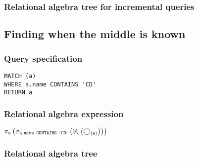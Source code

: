 \subsubsection*{Relational algebra tree for incremental queries}


\subsection{Finding when the middle is known}

\subsubsection*{Query specification}

\begin{lstlisting}
MATCH (a)
WHERE a.name CONTAINS 'CD'
RETURN a
\end{lstlisting}

\subsubsection*{Relational algebra expression}

$\projection{\var{a}} \left(\selection{\mathtt{a.name~CONTAINS~'CD'}} \left(\alldifferent{} \left(\getvertices{a}{}\right)\right)\right)$

\subsubsection*{Relational algebra tree}


